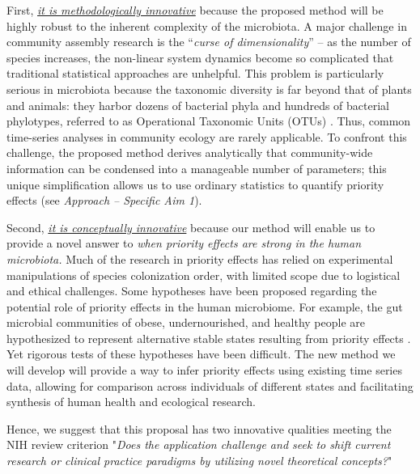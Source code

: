 \documentclass[12pt, class=article, crop=false]{standalone}
\begin{document}
First, \ul{\emph{it is methodologically innovative}} because the proposed method will be highly robust to the inherent complexity of the microbiota.
A major challenge in community assembly research is the ``\textit{curse of dimensionality}'' -- as the number of species increases, the non-linear system dynamics become so complicated that traditional statistical approaches are unhelpful.
This problem is particularly serious in microbiota because the taxonomic diversity is far beyond that of plants and animals: they harbor dozens of bacterial phyla and hundreds of bacterial phylotypes, referred to as Operational Taxonomic Units (OTUs) \citep{fierer_animalcules_2012}.
Thus, common time-series analyses in community ecology are rarely applicable.
To confront this challenge, the proposed method derives analytically that community-wide information can be condensed into a manageable number of parameters; this unique simplification allows us to use ordinary statistics to quantify priority effects (see \textit{Approach -- Specific Aim 1}).

Second, \ul{\emph{it is conceptually innovative}} because our method will enable us to provide a novel answer to \textit{when priority effects are strong in the human microbiota.}
Much of the research in priority effects has relied on experimental manipulations of species colonization order, with limited scope due to logistical and ethical challenges.
Some hypotheses have been proposed regarding the potential role of priority effects in the human microbiome.
For example, the gut microbial communities of obese, undernourished, and healthy people are hypothesized to represent alternative stable states resulting from priority effects \citep{fierer_animalcules_2012}.
Yet rigorous tests of these hypotheses have been difficult. 
The new method we will develop will provide a way to infer priority effects using existing time series data, allowing for comparison across individuals of different  states and facilitating synthesis of human health and ecological research.

Hence, we suggest that this proposal has two innovative qualities meeting the NIH review criterion "\emph{Does the application challenge and seek to shift current research or clinical practice paradigms by utilizing novel theoretical concepts?}"
\end{document}
